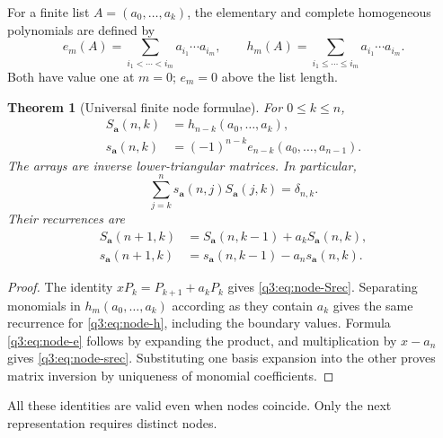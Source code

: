 \documentclass[11pt,a4paper,oneside,openany]{book}
\newtheorem{theorem}{Theorem}[chapter]
\theoremstyle{definition}
\theoremstyle{remark}
\begin{document}
For a finite list $A=(a_0,\ldots,a_k)$, the elementary and complete
homogeneous polynomials are defined by
\[
 e_m(A)=\sum_{i_1<\cdots<i_m}a_{i_1}\cdots a_{i_m},\qquad
 h_m(A)=\sum_{i_1\le\cdots\le i_m}a_{i_1}\cdots a_{i_m}.
\]
Both have value one at $m=0$; $e_m=0$ above the list length.

\begin{theorem}[Universal finite node formulae]
\label{q3:thm:node}
For $0\le k\le n$,
\begin{align}
 S_{\boldsymbol a}(n,k)&=h_{n-k}(a_0,\ldots,a_k),
 \label{q3:eq:node-h}\\
 s_{\boldsymbol a}(n,k)&=(-1)^{n-k}e_{n-k}(a_0,\ldots,a_{n-1}).
 \label{q3:eq:node-e}
\end{align}
The arrays are inverse lower-triangular matrices. In particular,
\begin{equation}
 \sum_{j=k}^ns_{\boldsymbol a}(n,j)S_{\boldsymbol a}(j,k)=\delta_{n,k}.
 \label{q3:eq:node-inverse}
\end{equation}
Their recurrences are
\begin{align}
 S_{\boldsymbol a}(n+1,k)&=S_{\boldsymbol a}(n,k-1)+a_kS_{\boldsymbol a}(n,k),
 \label{q3:eq:node-Srec}\\
 s_{\boldsymbol a}(n+1,k)&=s_{\boldsymbol a}(n,k-1)-a_ns_{\boldsymbol a}(n,k).
 \label{q3:eq:node-srec}
\end{align}
\end{theorem}
\begin{proof}
The identity $xP_k=P_{k+1}+a_kP_k$ gives
\cref{q3:eq:node-Srec}. Separating monomials in $h_m(a_0,\ldots,a_k)$
according as they contain $a_k$ gives the same recurrence for
\cref{q3:eq:node-h}, including the boundary values. Formula
\cref{q3:eq:node-e} follows by expanding the product, and multiplication by
$x-a_n$ gives \cref{q3:eq:node-srec}. Substituting one basis expansion into
the other proves matrix inversion by uniqueness of monomial coefficients.
\end{proof}
All these identities are valid even when nodes coincide. Only the next
representation requires distinct nodes.
\end{document}
